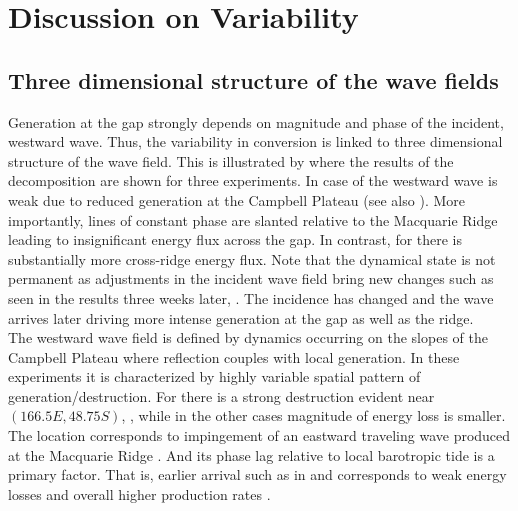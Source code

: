 \documentclass[12pt]{article}
\begin{document}
\section{Discussion on Variability}
\subsection{Three dimensional structure of the wave fields}
Generation at the gap strongly depends on magnitude and phase of the incident, westward wave. 
Thus, the variability in conversion is linked to three dimensional structure of the wave field. 
This is illustrated by  where the results of the decomposition are shown 
for three experiments. In case of  the westward wave is weak due to reduced generation at 
the Campbell Plateau (see also ). More importantly, lines of constant phase 
are slanted relative to the Macquarie Ridge leading to insignificant energy flux across the gap. In 
contrast, for  there is substantially more cross-ridge energy flux. Note that the 
dynamical state is not permanent as adjustments in the incident wave field bring new changes such 
as seen in the results three weeks later,  . The 
incidence has changed and the wave arrives later driving more intense generation at the gap as well 
as the ridge.\\

The westward wave field is defined by dynamics occurring on the slopes of the Campbell Plateau 
where reflection couples with local generation. In these experiments it is characterized by highly 
variable spatial pattern of generation/destruction. For  there is a strong destruction 
evident near $(166.5E, 48.75S)$, , while in the other cases 
magnitude 
of energy loss is smaller. The location corresponds to impingement of an eastward traveling wave 
produced at the Macquarie 
Ridge . And its phase lag relative to local barotropic tide 
is a primary factor. That is, earlier arrival such as in  and 
 corresponds to weak energy losses and overall higher production rates 
.\\
\end{document}
